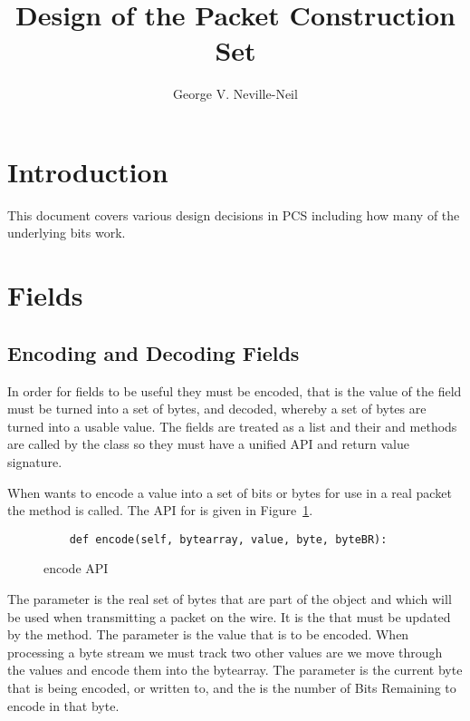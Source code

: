 \documentclass[11pt]{article}
\title{Design of the Packet Construction Set}
\author{George V. Neville-Neil}
\begin{document}
\maketitle
\tableofcontents

\section{Introduction}

This document covers various design decisions in PCS including how
many of the underlying bits work.

\section{Fields}
\label{sec:fields}

\subsection{Encoding and Decoding Fields}
\label{sec:encoding_and_decoding_fields}

In order for fields to be useful they must be encoded, that is the
value of the field must be turned into a set of bytes, and decoded,
whereby a set of bytes are turned into a usable value.  The fields are
treated as a list and their  and 
methods are called by the  class so they must have a
unified API and return value signature.

When  wants to encode a value into a set of bits or bytes
for use in a real packet the  method is called.  The
API for  is given in Figure~\ref{fig:encode_API}.

\begin{figure}
  \begin{lstlisting}
    def encode(self, bytearray, value, byte, byteBR):
  \end{lstlisting}
  \caption{encode API}
  \label{fig:encode_API}
\end{figure}

The  parameter is the real set of bytes that are
part of the  object and which will be used when
transmitting a packet on the wire.  It is the 
that must be updated by the  method.
The  parameter is the value that is to be encoded.
When processing a byte stream we must track two other values are we
move through the values and encode them into the bytearray.
The  parameter is the current byte that is being
encoded, or written to, and the  is the number of
Bits Remaining to encode in that byte.
\end{document}
